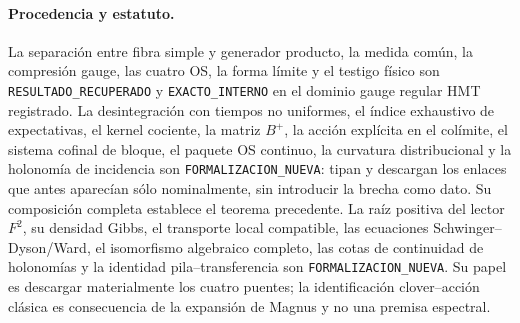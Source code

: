 \paragraph{Procedencia y estatuto.}
La separación entre fibra simple y generador producto, la medida común, la compresión
gauge, las cuatro OS, la forma límite y el testigo físico son
\texttt{RESULTADO\_RECUPERADO} y \texttt{EXACTO\_INTERNO} en el dominio gauge
regular HMT registrado. La desintegración con tiempos no uniformes, el índice
exhaustivo de expectativas, el kernel cociente, la matriz $B^+$, la acción explícita
en el colímite, el sistema cofinal de bloque, el paquete OS continuo, la curvatura
distribucional y la holonomía de incidencia son
\texttt{FORMALIZACION\_NUEVA}: tipan y descargan los enlaces que antes aparecían
sólo nominalmente, sin introducir la brecha como dato. Su composición completa
establece el teorema precedente.
La raíz positiva del lector $F^2$, su densidad Gibbs, el transporte local compatible,
las ecuaciones Schwinger--Dyson/Ward, el isomorfismo algebraico completo, las cotas
de continuidad de holonomías y la identidad pila--transferencia son
\texttt{FORMALIZACION\_NUEVA}. Su papel es descargar materialmente los cuatro
puentes; la identificación clover--acción clásica es consecuencia de la expansión
de Magnus y no una premisa espectral.
